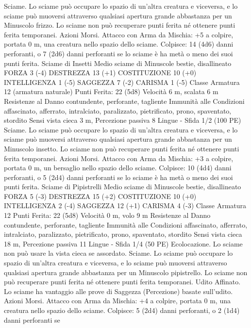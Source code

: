 \begin{multicols}{2}
Sciame. Lo sciame può occupare lo spazio di un’altra creatura e
viceversa, e lo sciame può muoversi attraverso qualsiasi apertura
grande abbastanza per un Minuscolo frizzo. Lo sciame non può
recuperare punti ferita né ottenere punti ferita temporanei.
Azioni
Morsi. Attacco con Arma da Mischia: +5 a colpire, portata 0 m,
una creatura nello spazio dello sciame.
Colpisce: 14 (4d6) danni perforanti, o 7 (2d6) danni perforanti se
lo sciame è ha metà o meno dei suoi punti ferita.
Sciame di Insetti
Medio sciame di Minuscole bestie, disallineato
FORZA 3 (-4)
DESTREZZA 13 (+1)
COSTITUZIONE 10 (+0)
INTELLIGENZA 1 (-5)
SAGGEZZA 7 (-2)
CARISMA 1 (-5)
Classe Armatura 12 (armatura naturale)
\hspace*{0pt}\hfill{Punti Ferita}: 22 (5d8)
Velocità 6 m, scalata 6 m
Resistenze al Danno contundente, perforante, tagliente
Immunità alle Condizioni affascinato, afferrato, intralciato,
paralizzato, pietrificato, prono, spaventato, stordito
Sensi vista cieca 3 m, Percezione passiva 8
Lingue -
Sfida 1/2 (100 PE)
Sciame. Lo sciame può occupare lo spazio di un’altra creatura e
viceversa, e lo sciame può muoversi attraverso qualsiasi apertura
grande abbastanza per un Minuscolo insetto. Lo sciame non può
recuperare punti ferita né ottenere punti ferita temporanei.
Azioni
Morsi. Attacco con Arma da Mischia: +3 a colpire, portata 0 m,
un bersaglio nello spazio dello sciame.
Colpisce: 10 (4d4) danni perforanti, o 5 (2d4) danni perforanti se
lo sciame è ha metà o meno dei suoi punti ferita.
Sciame di Pipistrelli
Medio sciame di Minuscole bestie, disallineato
FORZA 5 (-3)
DESTREZZA 15 (+2)
COSTITUZIONE 10 (+0)
INTELLIGENZA 2 (-4)
SAGGEZZA 12 (+1)
CARISMA 4 (-3)
Classe Armatura 12
\hspace*{0pt}\hfill{Punti Ferita}: 22 (5d8)
Velocità 0 m, volo 9 m
Resistenze al Danno contundente, perforante, tagliente
Immunità alle Condizioni affascinato, afferrato, intralciato,
paralizzato, pietrificato, prono, spaventato, stordito
Sensi vista cieca 18 m, Percezione passiva 11
Lingue -
Sfida 1/4 (50 PE)
Ecolocazione. Lo sciame non può usare la vista cieca se
assordato.
Sciame. Lo sciame può occupare lo spazio di un’altra creatura e
viceversa, e lo sciame può muoversi attraverso qualsiasi apertura
grande abbastanza per un Minuscolo pipistrello. Lo sciame non
può recuperare punti ferita né ottenere punti ferita temporanei.
Udito Affinato. Lo sciame ha vantaggio alle prove di Saggezza
(Percezione) basate sull’udito.
Azioni
Morsi. Attacco con Arma da Mischia: +4 a colpire, portata 0 m,
una creatura nello spazio dello sciame.
Colpisce: 5 (2d4) danni perforanti, o 2 (1d4) danni perforanti se

\end{multicols}
